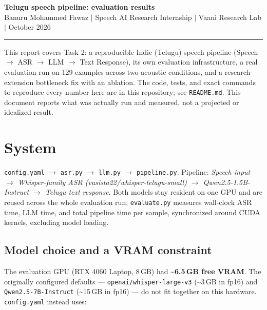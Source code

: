 \documentclass[11pt]{article}
\title{\vspace{-2em}}
\date{}
\begin{document}
\begin{center}
{\LARGE\bfseries Telugu speech pipeline: evaluation results}\\[0.6em]
{\large Banuru Mohammed Fawaz \; $\vert$ \; Speech AI Research Internship \; $\vert$ \; Vaani Research Lab \; $\vert$  October 2026}
\end{center}
\vspace{0.3em}
\hrule
\vspace{1em}

This report covers Task 2: a reproducible Indic (Telugu) speech pipeline (Speech $\to$ ASR $\to$ LLM $\to$ Text Response), its own evaluation infrastructure, a real evaluation run on 129 examples across two acoustic conditions, and a research-extension bottleneck fix with an ablation. The code, tests, and exact commands to reproduce every number here are in this repository; see \texttt{README.md}. This document reports what was actually run and measured, not a projected or idealized result.

\section{System}

\texttt{config.yaml} $\to$ \texttt{asr.py} $\to$ \texttt{llm.py} $\to$ \texttt{pipeline.py}. Pipeline: \textit{Speech input $\to$ Whisper-family ASR (vasista22/whisper-telugu-small) $\to$ Qwen2.5-1.5B-Instruct $\to$ Telugu text response}. Both models stay resident on one GPU and are reused across the whole evaluation run; \texttt{evaluate.py} measures wall-clock ASR time, LLM time, and total pipeline time per sample, synchronized around CUDA kernels, excluding model loading.

\subsection{Model choice and a VRAM constraint}

The evaluation GPU (RTX 4060 Laptop, 8\,GB) had \textbf{\textasciitilde 6.5\,GB free VRAM}. The originally configured defaults --- \texttt{openai/whisper-large-v3} (\textasciitilde 3\,GB in fp16) and \texttt{Qwen2.5-7B-Instruct} (\textasciitilde 15\,GB in fp16) --- do not fit together on this hardware. \texttt{config.yaml} instead uses:
\end{document}
